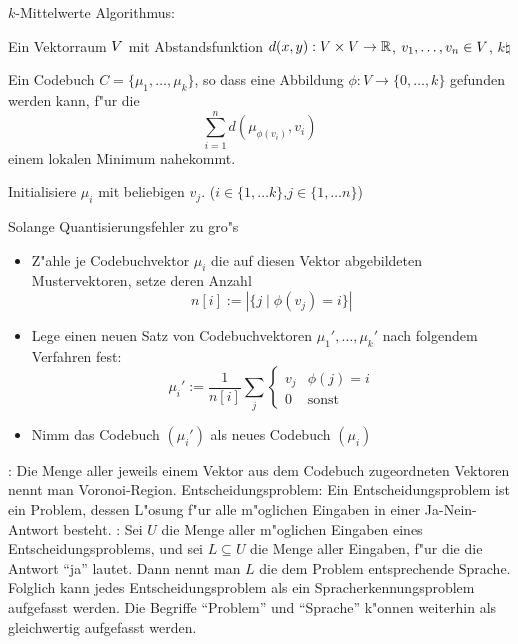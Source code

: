 \algorithm $k$-Mittelwerte Algorithmus:{
  \given Ein Vektorraum $V$ mit Abstandsfunktion 
    $d(x,y):V\times V\to\mathbb R$, $v_1,\ldots,v_n\in V$, $k\natural$
    
  \aim Ein Codebuch $C=\{\mu_1,\ldots,\mu_k\}$, so dass eine Abbildung 
    $\phi:V\to\{0,\ldots,k\}$ gefunden werden kann, f"ur die
    \[
      \sum_{i=1}^n d(\mu_{\phi(v_i)},v_i)
    \]
    einem lokalen Minimum nahekommt.
    
  \begin{proc}
    \item Initialisiere $\mu_i$ mit beliebigen $v_j$. 
      ($i\in\{1,\ldots k\}$,$j\in\{1,\ldots n\}$)
    \item Solange Quantisierungsfehler zu gro"s
      \begin{itemize}
        \item Z"ahle je Codebuchvektor $\mu_i$ die auf diesen Vektor 
          abgebildeten Mustervektoren, setze deren Anzahl
          \[
            n[i]:=|\{j\mid \phi(v_j)=i\}|
          \]
        \item Lege einen neuen Satz von Codebuchvektoren $\mu_1',\ldots,\mu_k'$
          nach folgendem Verfahren fest:
          \[
            \mu_i':=\frac 1 {n[i]} 
              \sum_j \begin{cases} v_j & \phi(j)=i \\ 0 & \text{sonst}\end{cases}
          \]
        \item Nimm das Codebuch $(\mu_i')$ als neues Codebuch $(\mu_i)$
      \end{itemize}
  \end{proc}
}
\remark:{
  Die Menge aller jeweils einem Vektor aus dem Codebuch zugeordneten 
  Vektoren nennt man Voronoi-Region.
}
 Entscheidungsproblem:{
  Ein Entscheidungsproblem ist ein Problem, dessen L"osung f"ur alle
  m"oglichen Eingaben in einer Ja-Nein-Antwort besteht.
}
\remark:{
  Sei $U$ die Menge aller m"oglichen Eingaben eines Entscheidungsproblems,
  und sei $L\subseteq U$ die Menge aller Eingaben, f"ur die die Antwort
  ``ja'' lautet. Dann nennt man $L$ die dem Problem entsprechende Sprache.
  Folglich kann jedes Entscheidungsproblem als ein Spracherkennungsproblem 
  aufgefasst werden. Die Begriffe ``Problem'' und ``Sprache'' k"onnen 
  weiterhin als gleichwertig aufgefasst werden.
}
